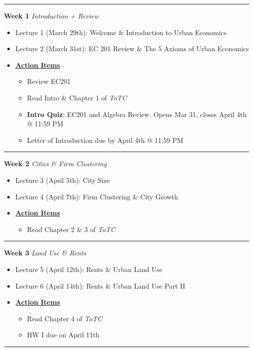 \documentclass[11pt]{article}
\begin{document}
	\noindent\rule[0.5ex]{\linewidth}{1pt}
	\textbf{Week 1} \textit{Introduction + Review}
	\begin{itemize}
		\item Lecture 1 (March 29th): Welcome \& Introduction to Urban Economics
		\item Lecture 2 (March 31st): EC 201 Review \& The 5 Axioms of Urban Economics
		\item[]\underline{\textbf{Action Items}}
		\begin{itemize}
			\item Review EC201
			\item Read Intro \& Chapter 1 of \textit{ToTC}
			\item \textbf{Intro Quiz}: EC201 and Algebra Review. Opens Mar 31, closes April 4th @ 11:59 PM
			\item Letter of Introduction due by April 4th @ 11:59 PM
		\end{itemize}
	\end{itemize}
	\noindent\rule[0.5ex]{\linewidth}{1pt}
	\textbf{Week 2} \textit{Cities \& Firm Clustering}
	\begin{itemize}
		\item Lecture 3 (April 5th): City Size
		\item Lecture 4 (April 7th):  Firm Clustering \& City Growth
		\item[]\underline{\textbf{Action Items}}
		\begin{itemize}
				\item Read Chapter 2 \& 3 of \textit{ToTC}
		\end{itemize}
	\end{itemize}
	\noindent\rule[0.5ex]{\linewidth}{1pt}
	
	
	
	\textbf{Week 3} \textit{Land Use \& Rents}
	
	\begin{itemize}
		\item Lecture 5 (April 12th):  Rents \& Urban Land Use
		\item Lecture 6 (April 14th): Rents \& Urban Land Use Part II
		\item[]\underline{\textbf{Action Items}}
		\begin{itemize}
			\item Read Chapter 4 of \textit{ToTC}
			\item HW I due on April 11th
	
		\end{itemize}
	\end{itemize}
	\noindent\rule[0.5ex]{\linewidth}{1pt}
	
\end{document}
